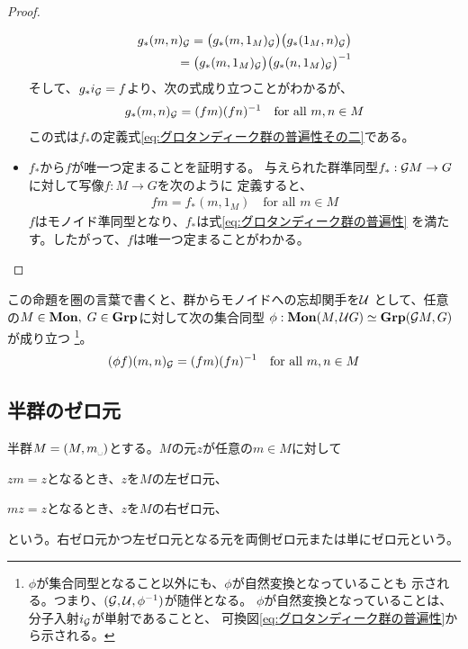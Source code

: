 \begin{proof}
\begin{itemize}
\begin{equation*}
\begin{split}
			g_*(m,n)_{{\mathcal{G}}}
			=\bigl(g_*(m,1_M)_{{\mathcal{G}}}\bigr)\bigl(g_*(1_M,n)_{{\mathcal{G}}}\bigr) \\
			=\bigl(g_*(m,1_M)_{{\mathcal{G}}}\bigr)\bigl(g_*(n,1_M)_{{\mathcal{G}}}\bigr)^{-1} \\
		\end{split}\end{equation*}
		そして、$g_*i_{{\mathcal{G}}}=f$より、次の式成り立つことがわかるが、
		\begin{equation*}\begin{split}
			g_*(m,n)_{{\mathcal{G}}} = (fm)(fn)^{-1} \quad\text{for all }m,n\in M
		\end{split}\end{equation*}
		この式は$f_*$の定義式\eqref{eq:グロタンディーク群の普遍性その二}である。
		\item $f_*$から$f$が唯一つ定まることを証明する。
		与えられた群準同型$f_*:{{\mathcal{G}}} M\to G$に対して写像$f:M\to G$を次のように
		定義すると、
		\begin{equation*}\begin{split}
			fm = f_*(m,1_M) \quad\text{for all }m\in M
		\end{split}\end{equation*}
		$f$はモノイド準同型となり、$f_*$は式\eqref{eq:グロタンディーク群の普遍性}
		を満たす。したがって、$f$は唯一つ定まることがわかる。
	\end{itemize} %
	\end{proof}

	この命題を圏の言葉で書くと、群からモノイドへの忘却関手を${{\mathcal{U}}}$
	として、任意の$M\in{\ensuremath{\mathbf{Mon}}},\;G\in{\ensuremath{\mathbf{Grp}}}$に対して次の集合同型
	$\phi:{\mathbf{Mon}}(M, {{\mathcal{U}}}G)\simeq{\ensuremath{\mathbf{Grp}}}({{\mathcal{G}}} M, G)$が成り立つ
	\footnote{
		$\phi$が集合同型となること以外にも、$\phi$が自然変換となっていることも
		示される。つまり、$({{\mathcal{G}}},{{\mathcal{U}}},\phi^{-1})$が随伴となる。
		$\phi$が自然変換となっていることは、分子入射$i_{{\mathcal{G}}}$が単射であることと、
		可換図\eqref{eq:グロタンディーク群の普遍性}から示される。
	}。
	\begin{equation*}\begin{split}
		(\phi f)(m,n)_{{\mathcal{G}}} = (fm)(fn)^{-1} \quad\text{for all }m,n\in M
	\end{split}\end{equation*}
\subsection{半群のゼロ元}\label{s2:ゼロ元} %
	\begin{definition}[ゼロ元]\label{def:ゼロ元} %
		半群$M=(M,m_\myspace)$とする。$M$の元$z$が任意の$m\in M$に対して
		\begin{description}\setlength{\itemsep}{-1mm} %
			\item[左ゼロ元] $zm=z$となるとき、$z$を$M$の左ゼロ元、
			\item[右ゼロ元] $mz=z$となるとき、$z$を$M$の右ゼロ元、
		\end{description} %
		という。右ゼロ元かつ左ゼロ元となる元を両側ゼロ元または単にゼロ元という。
	\end{definition} %

